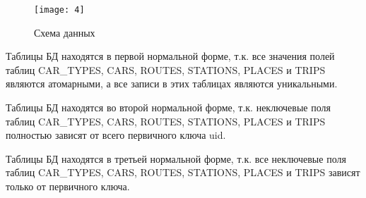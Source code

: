     \begin{figure}[h!]
        \centering
        \texttt{[image: 4]}
        \caption{Схема данных}
        \label{img:3}
    \end{figure}

    Таблицы БД находятся в первой нормальной форме, т.к. все значения полей таблиц CAR\_TYPES, CARS, ROUTES, STATIONS, PLACES и TRIPS являются атомарными, а все записи в этих таблицах являются уникальными.\par
    Таблицы БД находятся во второй нормальной форме, т.к. неключевые поля таблиц CAR\_TYPES, CARS, ROUTES, STATIONS, PLACES и TRIPS полностью зависят от всего первичного ключа uid.\par
    Таблицы БД находятся в третьей нормальной форме, т.к. все неключевые поля таблиц CAR\_TYPES, CARS, ROUTES, STATIONS, PLACES и TRIPS зависят только от первичного ключа.\par
    
    \vspace{0.8cm}
    
